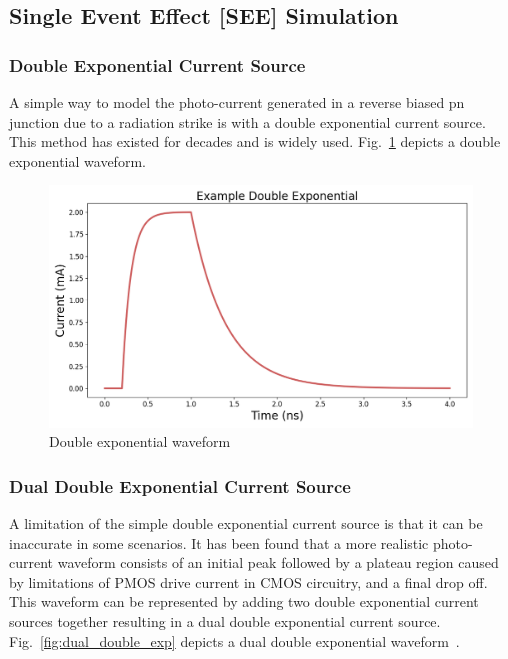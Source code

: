 \documentclass[conference]{IEEEtran}
\begin{document}
    \vspace{1em}

    \subsection{Single Event Effect [SEE] Simulation}\label{subsec:single-event-effect-[see]-simulation}

    \subsubsection{Double Exponential Current Source}
    A simple way to model the photo-current generated in a reverse biased pn junction due to a radiation strike is with a double exponential current source.
    This method has existed for decades and is widely used.
    Fig.~\ref{fig:double_exp} depicts a double exponential waveform.

    \begin{figure}[htbp]
        \centering
        \includegraphics[width=0.95\linewidth]{EX_Double_Exponential}
        \caption{Double exponential waveform}
        \label{fig:double_exp}
    \end{figure}

    \subsubsection{Dual Double Exponential Current Source}
    A limitation of the simple double exponential current source is that it can be inaccurate in some scenarios.
    It has been found that a more realistic photo-current waveform consists of an initial peak followed by a plateau region caused by limitations of PMOS drive current in CMOS circuitry, and a final drop off.
    This waveform can be represented by adding two double exponential current sources together resulting in a dual double exponential current source.
    Fig.~\ref{fig:dual_double_exp} depicts a dual double exponential waveform~\cite{Black2015}.
\end{document}
